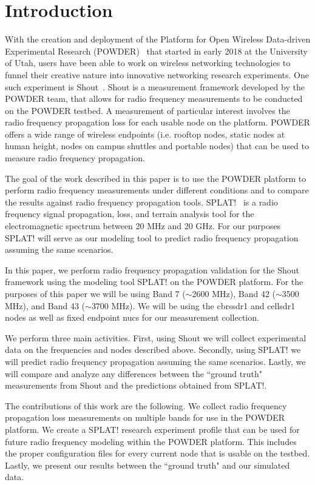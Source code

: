 

\section{Introduction}
\label{sec:introduction}

With the creation and deployment of the Platform for Open Wireless Data-driven Experimental Research (POWDER)~\cite{Breen+:wintech20}
that started in early 2018 at the University of Utah, users have been able to work on wireless networking technologies to funnel their creative 
nature into innovative networking research experiments. One such experiment is Shout~\cite{shout}. Shout is a measurement framework 
developed by the POWDER team, that allows for radio frequency measurements to be conducted on the POWDER testbed. A measurement 
of particular interest involves the radio frequency propagation loss for each usable node on the platform. POWDER offers a wide range of 
wireless endpoints (i.e. rooftop nodes, static nodes at human height, nodes on campus shuttles and portable nodes) that can be used to 
measure radio frequency propagation. 

The goal of the work described in this paper is to use the POWDER platform to perform radio frequency measurements under different conditions and to compare
the results against radio frequency propagation tools. SPLAT!~\cite{splat} is a radio frequency signal propagation, loss, and terrain analysis
tool for the electromagnetic spectrum between 20 MHz and 20 GHz. For our purposes SPLAT! will serve as our modeling tool to predict
radio frequency propagation assuming the same scenarios. 

In this paper, we perform radio frequency propagation validation for the Shout framework using the modeling tool SPLAT! on the POWDER
platform. For the purposes of this paper we will be using Band 7 ($\sim$2600 MHz), Band 42 ($\sim$3500 MHz), and Band 43 ($\sim$3700 
MHz). We will be using the cbrssdr1 and cellsdr1 nodes as well as fixed endpoint nucs for our measurement collection. 

We perform three main activities. First, using Shout we will collect experimental data on the frequencies and nodes described above. 
Secondly, using SPLAT! we will predict radio frequency propagation assuming the same scenarios. Lastly, we will compare and analyze
any differences between the ``ground truth" measurements from Shout and the predictions obtained from SPLAT!. 

The contributions of this work are the following. We collect radio frequency propagation loss measurements on multiple bands for use 
in the POWDER platform. We create a SPLAT! research experiment profile that can be used for future radio frequency modeling within the 
POWDER platform. This includes the proper configuration files for every current node that is usable on the testbed. Lastly, we present our
results between the ``ground truth" and our simulated data.


